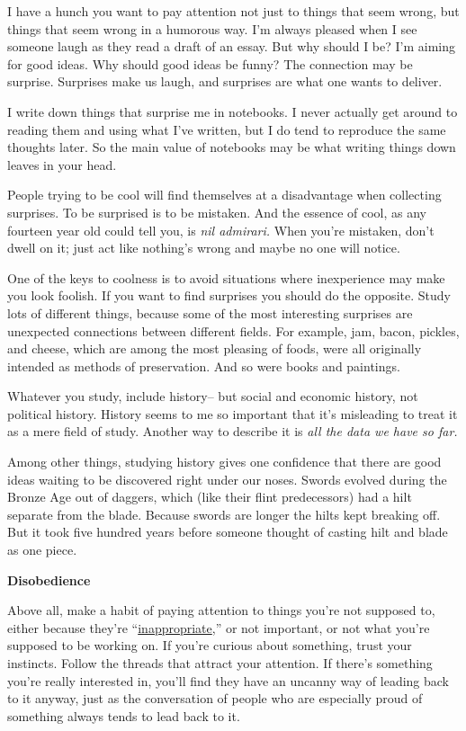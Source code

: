 \documentclass[12pt]{book}
\begin{document}
I have a hunch you want to pay attention not just to things that seem
wrong, but things that seem wrong in a humorous way. I'm always pleased
when I see someone laugh as they read a draft of an essay. But why
should I be? I'm aiming for good ideas. Why should good ideas be funny?
The connection may be surprise. Surprises make us laugh, and surprises
are what one wants to deliver.

I write down things that surprise me in notebooks. I never actually get
around to reading them and using what I've written, but I do tend to
reproduce the same thoughts later. So the main value of notebooks may be
what writing things down leaves in your head.

People trying to be cool will find themselves at a disadvantage when
collecting surprises. To be surprised is to be mistaken. And the essence
of cool, as any fourteen year old could tell you, is \emph{nil
admirari.} When you're mistaken, don't dwell on it; just act like
nothing's wrong and maybe no one will notice.

One of the keys to coolness is to avoid situations where inexperience
may make you look foolish. If you want to find surprises you should do
the opposite. Study lots of different things, because some of the most
interesting surprises are unexpected connections between different
fields. For example, jam, bacon, pickles, and cheese, which are among
the most pleasing of foods, were all originally intended as methods of
preservation. And so were books and paintings.

Whatever you study, include history-- but social and economic history,
not political history. History seems to me so important that it's
misleading to treat it as a mere field of study. Another way to describe
it is \emph{all the data we have so far.}

Among other things, studying history gives one confidence that there are
good ideas waiting to be discovered right under our noses. Swords
evolved during the Bronze Age out of daggers, which (like their flint
predecessors) had a hilt separate from the blade. Because swords are
longer the hilts kept breaking off. But it took five hundred years
before someone thought of casting hilt and blade as one piece.

\textbf{Disobedience}

Above all, make a habit of paying attention to things you're not
supposed to, either because they're ``\href{say.html}{inappropriate},''
or not important, or not what you're supposed to be working on. If
you're curious about something, trust your instincts. Follow the threads
that attract your attention. If there's something you're really
interested in, you'll find they have an uncanny way of leading back to
it anyway, just as the conversation of people who are especially proud
of something always tends to lead back to it.
\end{document}
